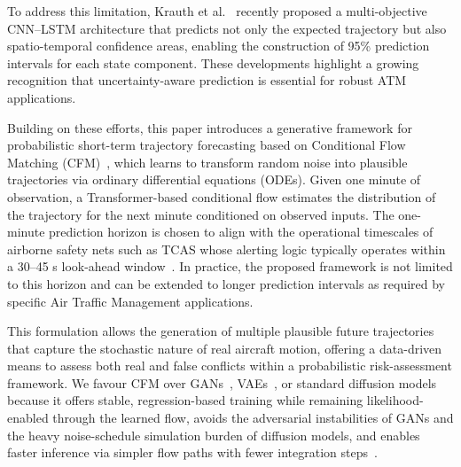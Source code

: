 \documentclass[
  manuscript=proceedings,  %
  layout=preprint,  %
  year=20xx,
  volume=x,
]{extra/joas}
\begin{document}
To address this limitation, Krauth et al.~\cite{krauth2025multi} recently proposed a multi-objective CNN--LSTM architecture that predicts not only the expected trajectory but also spatio-temporal confidence areas, enabling the construction of 95\% prediction intervals for each state component. 
These developments highlight a growing recognition that uncertainty-aware prediction is essential for robust ATM applications.


Building on these efforts, this paper introduces a generative framework for probabilistic short-term trajectory forecasting based on Conditional Flow Matching (CFM)~\cite{lipman2023flowmatching}, which learns to transform random noise into plausible trajectories via ordinary differential equations (ODEs). Given one minute of observation, a Transformer-based conditional flow estimates the distribution of the trajectory for the next minute conditioned on observed inputs. The one-minute prediction horizon is chosen to align with the operational timescales of airborne safety nets such as TCAS whose alerting logic typically operates within a 30–45 s look-ahead window~\cite{munoz2013tcas}. In practice, the proposed framework is not limited to this horizon and can be extended to longer prediction intervals as required by specific Air Traffic Management applications. 

This formulation allows the generation of multiple plausible future trajectories that capture the stochastic nature of real aircraft motion, offering a data-driven means to assess both real and false conflicts within a probabilistic risk-assessment framework. We favour CFM over GANs~\cite{goodfellow2020generative}, VAEs~\cite{kingma2013auto}, or standard diffusion models~\cite{ho2020denoising} because it offers stable, regression-based training while remaining likelihood-enabled through the learned flow, avoids the adversarial instabilities of GANs and the heavy noise-schedule simulation burden of diffusion models, and enables faster inference via simpler flow paths with fewer integration steps~\cite{tong2023improving}.
\end{document}
